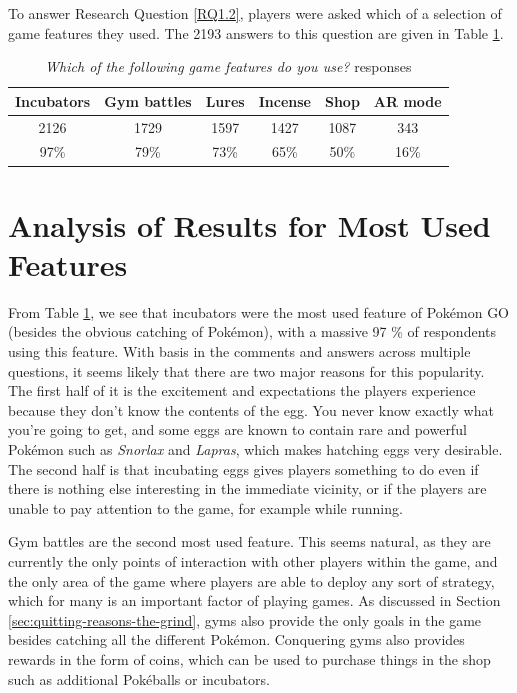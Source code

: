 To answer Research Question \ref{RQ1.2}, players were asked which of a selection of game features they used. The 2193 answers to this question are given in Table \ref{tbl:pokemon-go-features-used}.

\begin{table}[h]
	\centering
	\caption{\emph{Which of the following game features do you use?} responses}
	\label{tbl:pokemon-go-features-used}
	\begin{tabular}{|c|c|c|c|c|c|}
		\hline
		\textbf{Incubators} & \textbf{Gym battles} & \textbf{Lures} & \textbf{Incense} & \textbf{Shop} & \textbf{AR mode}\\
		\hline\hline
		2126	& 1729	& 1597	& 1427	& 1087	& 343\\
		97\%	& 79\%	& 73\%	& 65\%	& 50\%	& 16\%\\\hline
	\end{tabular}
\end{table}

\section{Analysis of Results for Most Used Features}
From Table \ref{tbl:pokemon-go-features-used}, we see that incubators were the most used feature of Pokémon GO (besides the obvious catching of Pokémon), with a massive 97 \% of respondents using this feature. With basis in the comments and answers across multiple questions, it seems likely that there are two major reasons for this popularity. The first half of it is the excitement and expectations the players experience because they don't know the contents of the egg. You never know exactly what you're going to get, and some eggs are known to contain rare and powerful Pokémon such as \emph{Snorlax} and \emph{Lapras}, which makes hatching eggs very desirable. The second half is that incubating eggs gives players something to do even if there is nothing else interesting in the immediate vicinity, or if the players are unable to pay attention to the game, for example while running.

Gym battles are the second most used feature. This seems natural, as they are currently the only points of interaction with other players within the game, and the only area of the game where players are able to deploy any sort of strategy, which for many is an important factor of playing games. As discussed in Section \ref{sec:quitting-reasons-the-grind}, gyms also provide the only goals in the game besides catching all the different Pokémon. Conquering gyms also provides rewards in the form of coins, which can be used to purchase things in the shop such as additional Pokéballs or incubators.

